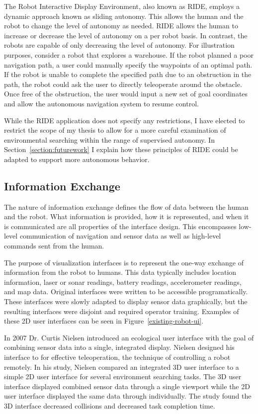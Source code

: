 The Robot Interactive Display Environment, also known as RIDE, employs a dynamic approach known as sliding autonomy. This allows the human and the robot to change the level of autonomy as needed. RIDE allows the human to increase or decrease the level of autonomy on a per robot basis. In contrast, the robots are capable of only decreasing the level of autonomy. For illustration purposes, consider a robot that explores a warehouse. If the robot planned a poor navigation path, a user could manually specify the waypoints of an optimal path. If the robot is unable to complete the specified path due to an obstruction in the path, the robot could ask the user to directly teleoperate around the obstacle. Once free of the obstruction, the user would input a new set of goal coordinates and allow the autonomous navigation system to resume control.

While the RIDE application does not specify any restrictions, I have elected to restrict the scope of my thesis to allow for a more careful examination of environmental searching within the range of supervised autonomy. In Section~\ref{section:futurework} I explain how these principles of RIDE could be adapted to support more autonomous behavior.

\subsection{Information Exchange}

The nature of information exchange defines the flow of data between the human and the robot. What information is provided, how it is represented, and when it is communicated are all properties of the interface design. This encompasses low-level communication of navigation and sensor data as well as high-level commands sent from the human. 

The purpose of visualization interfaces is to represent the one-way exchange of information from the robot to humans. This data typically includes location information, laser or sonar readings, battery readings, accelerometer readings, and map data. Original interfaces were written to be accessible programatically. These interfaces were slowly adapted to display sensor data graphically, but the resulting interfaces were disjoint and required operator training. Examples of these 2D user interfaces can be seen in Figure~\ref{existing-robot-ui}.

In 2007 Dr. Curtis Nielsen introduced an ecological user interface with the goal of combining sensor data into a single, integrated display. Nielsen designed his interface to for effective teleoperation, the technique of controlling a robot remotely. In his study, Nielsen compared an integrated 3D user interface to a simple 2D user interface for several environment searching tasks. The 3D user interface displayed combined sensor data through a single viewport while the 2D user interface displayed the same data through individually. The study found the 3D interface decreased collisions and decreased task completion time. \cite{Nielsen_Teleoperation}

